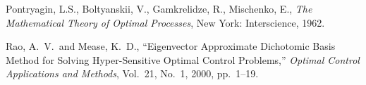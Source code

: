 \documentclass[10pt,final]{report}
\begin{document}
\begin{thebibliography}{}
   Pontryagin, L.S., Boltyanskii,
  V., Gamkrelidze, R., Mischenko, E., {\em The Mathematical Theory of
    Optimal Processes}, New York: Interscience, 1962.

   Rao, A.~V.~and Mease, K.~D., ``Eigenvector
  Approximate Dichotomic Basis Method for Solving Hyper-Sensitive Optimal
  Control Problems,'' {\em Optimal Control Applications and Methods},
    Vol.~21, No.~1, 2000, pp.~1--19.

\end{thebibliography}
\end{document}
